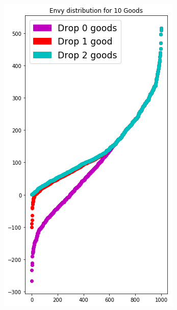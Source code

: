 \begin{figure}[h!]
  \centering
  \begin{subfigure}[b]{0.47\linewidth}
    \includegraphics[width=\linewidth]{images/envy_density/envy_density_us19.png}
    \caption{}
  \end{subfigure}
  \begin{subfigure}[b]{0.47\linewidth}

\end{subfigure}
\end{figure}
